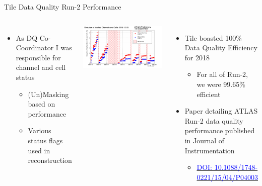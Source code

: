 \documentclass[aspectratio=169,xcolor=table]{beamer}
\begin{document}
    \begin{frame}[t]{Tile Data Quality Run-2 Performance}
      \begin{columns}
          \begin{itemize}
            \item As DQ Co-Coordinator I was responsible for channel and cell status
            \begin{itemize}
              \item (Un)Masking based on performance
              \item Various status flags used in reconstruction
            \end{itemize}
          \end{itemize}
          \centering
          \includegraphics[height=.45\textheight,keepaspectratio=true]{masked_cells_timeline_2018.png}
          \begin{itemize}
              \item Tile boasted 100\% Data Quality Efficiency for 2018
              \begin{itemize}
                \item For all of Run-2, we were 99.65\% efficient
              \end{itemize}
              \item Paper detailing ATLAS Run-2 data quality performance published in Journal of Instrumentation 
              \begin{itemize}
                \item \href{https://iopscience.iop.org/article/10.1088/1748-0221/15/04/P04003}{\textcolor{blue}{{\tiny DOI: 10.1088/1748-0221/15/04/P04003}}}
              \end{itemize}
            \end{itemize}
          \centering

\end{columns}
\end{frame}
\end{document}
